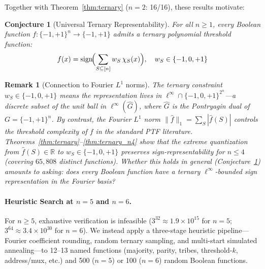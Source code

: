 \documentclass[Royal,times,sageh]{sagej}
\newcommand{\sign}{\text{sign}}
\newtheorem{remark}{Remark}
\newtheorem{conjecture}{Conjecture}
\begin{document}
Together with Theorem~\ref{thm:ternary} ($n=2$: 16/16), these results motivate:

\begin{conjecture}[Universal Ternary Representability]
\label{conj:ternary}
For all $n \geq 1$, every Boolean function $f: \{-1,+1\}^n \to \{-1,+1\}$ admits a ternary polynomial threshold function:
\begin{equation}
    f(x) = \sign\!\Bigl(\sum_{S \subseteq [n]} w_S \,\chi_S(x)\Bigr), \quad w_S \in \{-1,0,+1\}
\end{equation}
\end{conjecture}

\begin{remark}[Connection to Fourier $L^1$ norms]
The ternary constraint $w_S \in \{-1,0,+1\}$ means the representation lives in $\ell^\infty \cap \{-1,0,+1\}^{2^n}$---a discrete subset of the unit ball in $\ell^\infty(\widehat{G})$, where $\widehat{G}$ is the Pontryagin dual of $G = \{-1,+1\}^n$. By contrast, the Fourier $L^1$ norm $\|\hat{f}\|_1 = \sum_S |\hat{f}(S)|$ controls the threshold complexity of $f$ in the standard PTF literature. Theorems~\ref{thm:ternary}--\ref{thm:ternary_n4} show that the extreme quantization from $\hat{f}(S) \in \mathbb{R}$ to $w_S \in \{-1,0,+1\}$ preserves sign-representability for $n \leq 4$ (covering $65{,}808$ distinct functions). Whether this holds in general (Conjecture~\ref{conj:ternary}) amounts to asking: does every Boolean function have a ternary $\ell^\infty$-bounded sign representation in the Fourier basis?
\end{remark}

\paragraph{Heuristic Search at $n=5$ and $n=6$.}
For $n \geq 5$, exhaustive verification is infeasible ($3^{32} \approx 1.9 \times 10^{15}$ for $n=5$; $3^{64} \approx 3.4 \times 10^{30}$ for $n=6$). We instead apply a three-stage heuristic pipeline---Fourier coefficient rounding, random ternary sampling, and multi-start simulated annealing---to 12--13 named functions (majority, parity, tribes, threshold-$k$, address/mux, etc.) and 500 ($n=5$) or 100 ($n=6$) random Boolean functions.
\end{document}
